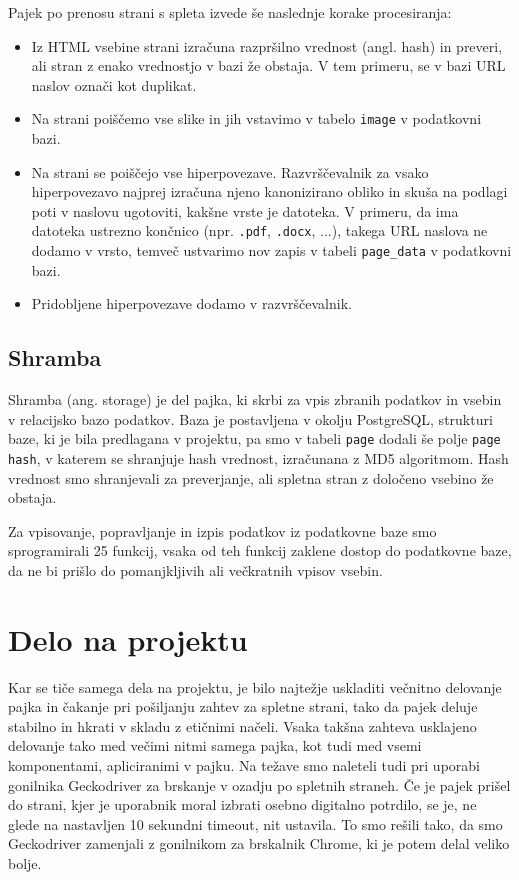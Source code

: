 \documentclass[conference]{IEEEtran}
\begin{document}
	Pajek po prenosu strani s spleta izvede še naslednje korake procesiranja:
	\begin{itemize}
		\item Iz HTML vsebine strani izračuna razpršilno vrednost (angl. hash) in preveri, ali stran z enako vrednostjo v bazi že obstaja. V tem primeru, se v bazi URL naslov označi kot duplikat.
		\item Na strani poiščemo vse slike in jih vstavimo v tabelo \texttt{image} v podatkovni bazi.
		\item Na strani se poiščejo vse hiperpovezave. Razvrščevalnik za vsako hiperpovezavo najprej izračuna njeno kanonizirano obliko in skuša na podlagi poti v naslovu ugotoviti, kakšne vrste je datoteka. V primeru, da ima datoteka ustrezno končnico (npr. \texttt{.pdf}, \texttt{.docx}, ...), takega URL naslova ne dodamo v vrsto, temveč ustvarimo nov zapis v tabeli \texttt{page\_data} v podatkovni bazi.
		\item Pridobljene hiperpovezave dodamo v razvrščevalnik.
	\end{itemize}
	
	\subsection{Shramba}
	
	Shramba (ang. storage) je del pajka, ki skrbi za vpis zbranih podatkov in vsebin v relacijsko bazo podatkov. Baza je postavljena v okolju PostgreSQL, strukturi baze, ki je bila predlagana v projektu, pa smo v tabeli \texttt{page} dodali še polje \texttt{page hash}, v katerem se shranjuje hash vrednost, izračunana z MD5 algoritmom. Hash vrednost smo shranjevali za preverjanje, ali spletna stran z določeno vsebino že obstaja. 
	
	Za vpisovanje, popravljanje in izpis podatkov iz podatkovne baze smo sprogramirali 25 funkcij, vsaka od teh funkcij zaklene dostop do podatkovne baze, da ne bi prišlo do pomanjkljivih ali večkratnih vpisov vsebin.
	
	\section{Delo na projektu}
	
	Kar se tiče samega dela na projektu, je bilo najtežje uskladiti večnitno delovanje pajka in čakanje pri pošiljanju zahtev za spletne strani, tako da pajek deluje stabilno in hkrati v skladu z etičnimi načeli. Vsaka takšna zahteva usklajeno delovanje tako med večimi nitmi samega pajka, kot tudi med vsemi komponentami, apliciranimi v pajku.
	Na težave smo naleteli tudi pri uporabi gonilnika Geckodriver za brskanje v ozadju po spletnih straneh. Če je pajek prišel do strani, kjer je uporabnik moral izbrati osebno digitalno potrdilo, se je, ne glede na nastavljen 10 sekundni timeout, nit ustavila. To smo rešili tako, da smo Geckodriver zamenjali z gonilnikom za brskalnik Chrome, ki je potem delal veliko bolje.
	
\end{document}

